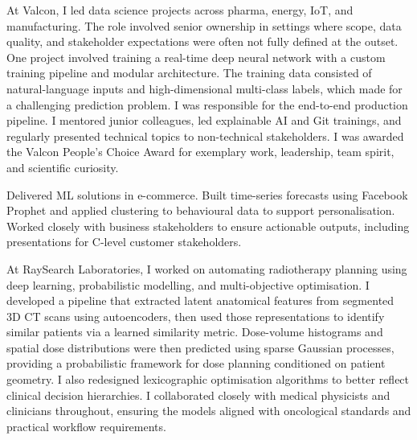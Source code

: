 \documentclass[11pt,a4paper]{moderncv}
\begin{document}
\label{sec:valcon}
 {
    At Valcon, I led data science projects across pharma, energy, IoT, and manufacturing. The role involved senior ownership in settings where scope, data quality, and stakeholder expectations were often not fully defined at the outset.
    \newline\hspace*{2em}
    One project involved training a real-time deep neural network with a custom training pipeline and modular architecture. The training data consisted of natural-language inputs and high-dimensional multi-class labels, which made for a challenging prediction problem. I was responsible for the end-to-end production pipeline.
    \newline\hspace*{2em}
    I mentored junior colleagues, led explainable AI and Git trainings, and regularly presented technical topics to non-technical stakeholders. I was awarded the Valcon People's Choice Award for exemplary work, leadership, team spirit, and scientific curiosity.
}{}

\label{sec:valtech}
 {
    Delivered ML solutions in e-commerce. Built time-series forecasts using Facebook Prophet and applied clustering to behavioural data to support personalisation. Worked closely with business stakeholders to ensure actionable outputs, including presentations for C-level customer stakeholders.
}{}

\label{sec:raysearch}
 {
    At RaySearch Laboratories, I worked on automating radiotherapy planning using deep learning, probabilistic modelling, and multi-objective optimisation. I developed a pipeline that extracted latent anatomical features from segmented 3D CT scans using autoencoders, then used those representations to identify similar patients via a learned similarity metric. Dose-volume histograms and spatial dose distributions were then predicted using sparse Gaussian processes, providing a probabilistic framework for dose planning conditioned on patient geometry. I also redesigned lexicographic optimisation algorithms to better reflect clinical decision hierarchies.
    \newline\hspace*{2em}
    I collaborated closely with medical physicists and clinicians throughout, ensuring the models aligned with oncological standards and practical workflow requirements.
}{}
\end{document}
